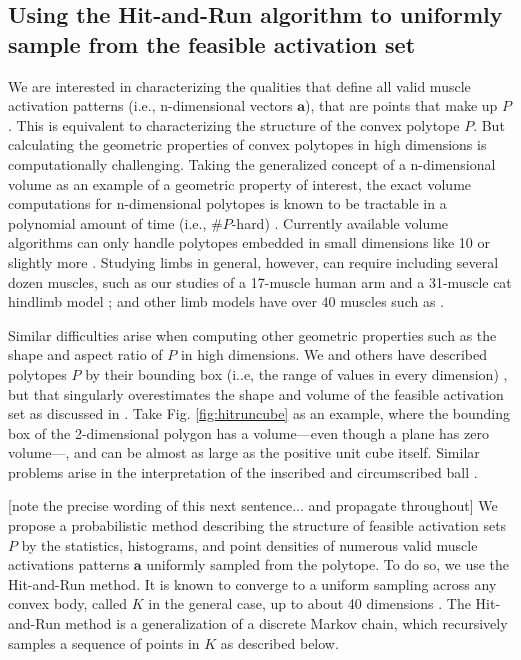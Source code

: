 \documentclass[10pt,letterpaper]{article}
\begin{document}
\subsection*{Using the Hit-and-Run algorithm to uniformly sample from the feasible activation set}
\label{ss:hitrun}
We are interested in characterizing the qualities that define all valid muscle activation patterns (i.e., n-dimensional vectors $\textbf{a}$), that are points that make up $P$. This is equivalent to characterizing the structure of the convex polytope $P$. But calculating the geometric properties of convex polytopes in high dimensions is computationally challenging. Taking the generalized concept of a n-dimensional volume as an example of a geometric property of interest, the exact volume computations for n-dimensional polytopes is known to be tractable in a polynomial amount of time (i.e.,  $\#P$-hard) \cite{Dyer}.
Currently available volume algorithms can only handle polytopes embedded in small dimensions like 10 or slightly more \cite{Bueler2}. Studying limbs in general, however, can require including  several dozen muscles, such as our studies of a 17-muscle human arm and a 31-muscle cat hindlimb model \cite{Valero-Cuevas2015high-dimensional}; and other limb models have over 40 muscles such as  \cite{arnold2010model, kutch2012challenges, hamner2010muscle, de2014human}.

Similar difficulties arise when computing other geometric properties such as the shape and aspect ratio of $P$ in high dimensions. We and others have described polytopes $P$ by their bounding box (i..e, the range of values in every dimension) \cite{sohn2013cat_bounding_box,kutch2011muscle}, but  that  singularly overestimates the shape and volume of the feasible activation set as discussed in \cite{Valero-Cuevas2015high-dimensional}. Take Fig. \ref{fig:hitruncube} as an example, where the bounding box of the 2-dimensional polygon has a volume---even though a plane has zero volume---, and can be almost as large as the positive unit cube itself. Similar problems arise in the interpretation of the inscribed and circumscribed ball \cite{inouye2014optimizing}.

[note the precise wording of this next sentence... and propagate throughout]
We propose a probabilistic method describing the structure of feasible activation sets $P$ by the statistics, histograms, and point densities of numerous valid muscle activations patterns $\textbf{a}$ uniformly sampled from the polytope. To do so, we use the Hit-and-Run method. It is known to converge to a uniform sampling across any convex body, called  $K$ in the general case, up to about 40 dimensions \cite{smith1984efficient}.
The Hit-and-Run method is a generalization of a discrete Markov chain, which recursively samples a sequence of points in $K$ as described below.
\end{document}
